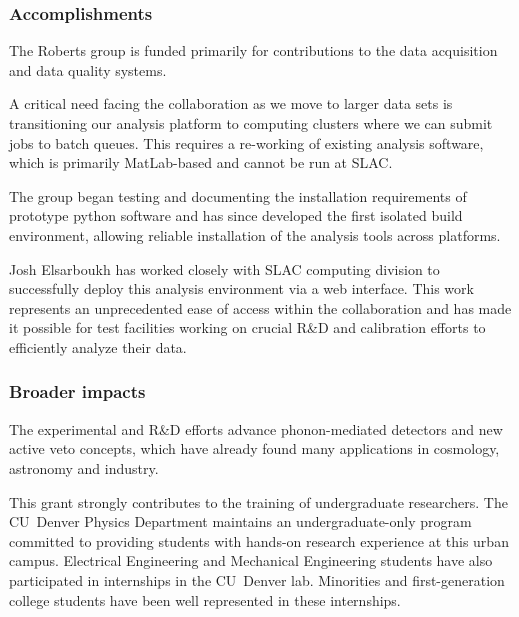 \subsubsection{Accomplishments}
The Roberts group is funded primarily for contributions to the data acquisition and data quality systems.

A critical need facing the collaboration as we move to larger data sets is transitioning our analysis platform to computing clusters where we can submit jobs to batch queues.  This requires a re-working of existing analysis software, which is primarily MatLab-based and cannot be run at SLAC.

The group began testing and documenting the installation requirements of prototype python software and has since developed the first isolated build environment, allowing reliable installation of the analysis tools across platforms.

Josh Elsarboukh has worked closely with SLAC computing division to successfully deploy this analysis environment via a web interface.  This work represents an unprecedented ease of access within the collaboration and has made it possible for test facilities working on crucial R\&D and calibration efforts to efficiently analyze their data.

\subsubsection{Broader impacts}
The \SuperCDMS experimental and R\&D efforts advance phonon-mediated detectors and new active veto concepts, which have already found many applications in cosmology, astronomy and industry. 

This grant strongly contributes to the training of undergraduate researchers.  The CU~Denver Physics Department maintains an undergraduate-only program committed to providing students with hands-on research experience at this urban campus. Electrical Engineering and Mechanical Engineering students have also participated in internships in the CU~Denver lab. Minorities and first-generation college students have been well represented in these internships.